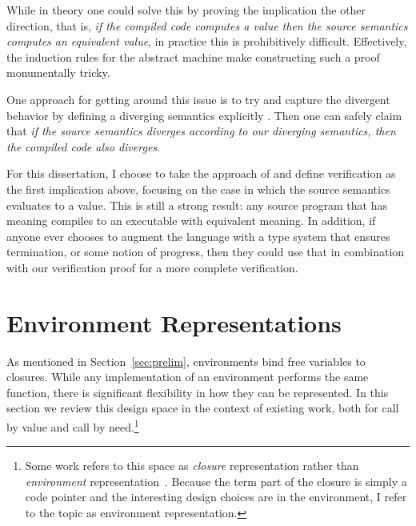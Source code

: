 While in theory one could solve this by proving the implication the other
direction, that is, \emph{if the compiled code computes a value then the source
semantics computes an equivalent value}, in practice this is prohibitively
difficult. Effectively, the induction rules for the abstract machine make
constructing such a proof monumentally tricky. 

One approach for getting around this issue is to try and capture the divergent
behavior by defining a diverging semantics explicitly \cite{functionalbigstep}.
Then one can safely claim that \emph{if the source semantics diverges according to
our diverging semantics, then the compiled code also diverges}. 

For this dissertation, I choose to take the approach of \cite{chlipala2007certified}
and define verification as the first implication above, focusing on the case in
which the source semantics evaluates to a value. This is still a strong
result: any source program that has meaning compiles to an executable with
equivalent meaning. In addition, if anyone ever chooses to augment the language
with a type system that ensures termination, or some notion of progress, then
they could use that in combination with our verification proof for a more
complete verification.

\section{Environment Representations} \label{sec:env}

As mentioned in Section~\ref{sec:prelim}, environments bind free variables to
closures. While any implementation of an environment performs the same function,
there is significant flexibility in how they can be represented. In this section
we review this design space in the context of existing work, both for call by
value and call by need.\footnote{Some work refers to this space as
\emph{closure} representation rather than \emph{environment}
representation~\cite{shao1994space,appel1988optimizing}.  Because the term part
of the closure is simply a code pointer and the interesting design choices are
in the environment, I refer to the topic as environment representation.}

